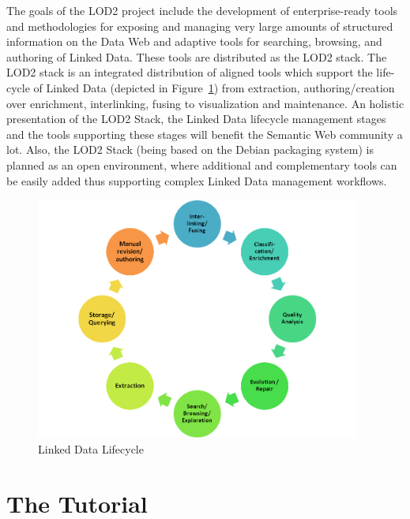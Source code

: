 \documentclass[a4paper, 11pt]{llncs}
\begin{document}
The goals of the LOD2 project include the development of enterprise-ready tools and methodologies for exposing and managing very large amounts of structured information on the Data Web and adaptive tools for searching, browsing, and authoring of Linked Data.
These tools are distributed as the LOD2 stack.
The LOD2 stack is an integrated distribution of aligned tools which support the life-cycle of Linked Data (depicted in Figure~\ref{fig:lifecycle}) from extraction, authoring/creation over enrichment, interlinking, fusing to visualization and maintenance.
An holistic presentation of the LOD2 Stack, the Linked Data lifecycle management stages and the tools supporting these stages will benefit the Semantic Web community a lot.
Also, the LOD2 Stack (being based on the Debian packaging system) is planned as an open environment, where additional and complementary tools can be easily added thus supporting complex Linked Data management workflows.

\begin{figure}[t]
	\centering
		\includegraphics[width=0.95\textwidth]{lod-lifecycle-small}
	\caption{Linked Data Lifecycle}
	\label{fig:lifecycle}
\end{figure}

\section{The Tutorial}

    
\end{document}
